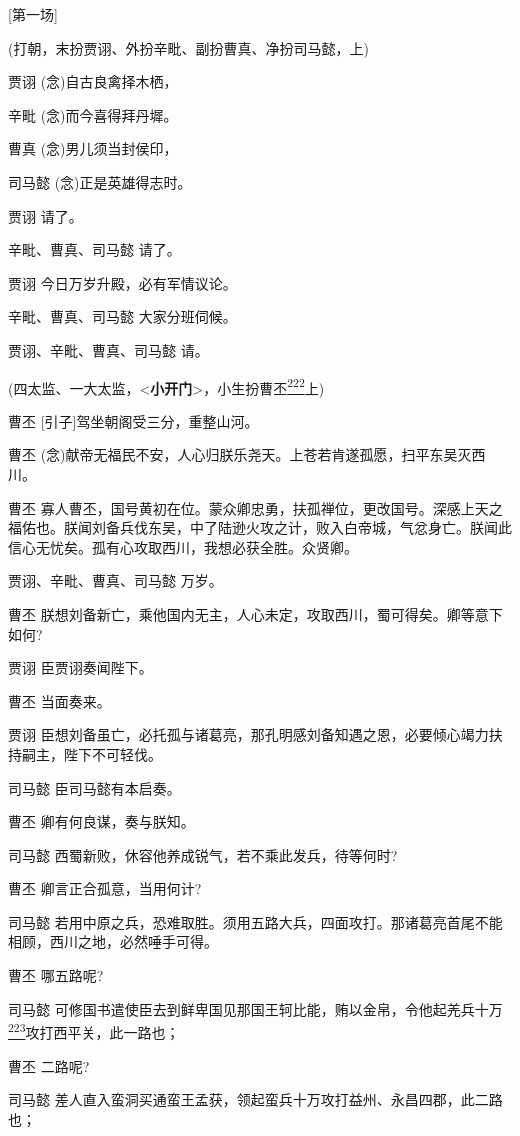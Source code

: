 {[}第一场{]}

(打朝，末扮贾诩、外扮辛毗、副扮曹真、净扮司马懿，上)

贾诩 (念)自古良禽择木栖，

辛毗 (念)而今喜得拜丹墀。

曹真 (念)男儿须当封侯印，

司马懿 (念)正是英雄得志时。

贾诩 请了。

辛毗、曹真、司马懿 请了。

贾诩 今日万岁升殿，必有军情议论。

辛毗、曹真、司马懿 大家分班伺候。

贾诩、辛毗、曹真、司马懿 请。

(四太监、一大太监，\textless{}\textbf{小开门}\textgreater{}，小生扮曹丕\protect\hyperlink{fn222}{\textsuperscript{222}}上)

曹丕 {[}引子{]}驾坐朝阁受三分，重整山河。

曹丕
(念)献帝无福民不安，人心归朕乐尧天。上苍若肯遂孤愿，扫平东吴灭西川。

曹丕
寡人曹丕，国号黄初在位。蒙众卿忠勇，扶孤禅位，更改国号。深感上天之福佑也。朕闻刘备兵伐东吴，中了陆逊火攻之计，败入白帝城，气忿身亡。朕闻此信心无忧矣。孤有心攻取西川，我想必获全胜。众贤卿。

贾诩、辛毗、曹真、司马懿 万岁。

曹丕
朕想刘备新亡，乘他国内无主，人心未定，攻取西川，蜀可得矣。卿等意下如何?

贾诩 臣贾诩奏闻陛下。

曹丕 当面奏来。

贾诩
臣想刘备虽亡，必托孤与诸葛亮，那孔明感刘备知遇之恩，必要倾心竭力扶持嗣主，陛下不可轻伐。

司马懿 臣司马懿有本启奏。

曹丕 卿有何良谋，奏与朕知。

司马懿 西蜀新败，休容他养成锐气，若不乘此发兵，待等何时?

曹丕 卿言正合孤意，当用何计?

司马懿
若用中原之兵，恐难取胜。须用五路大兵，四面攻打。那诸葛亮首尾不能相顾，西川之地，必然唾手可得。

曹丕 哪五路呢?

司马懿
可修国书遣使臣去到鲜卑国见那国王轲比能，贿以金帛，令他起羌兵十万\protect\hyperlink{fn223}{\textsuperscript{223}}攻打西平关，此一路也；

曹丕 二路呢?

司马懿
差人直入蛮洞买通蛮王孟获，领起蛮兵十万攻打益州、永昌四郡，此二路也；

